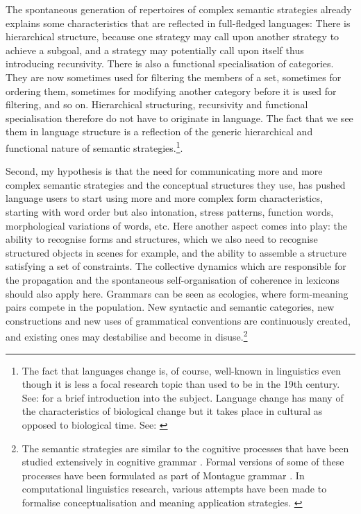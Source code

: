 The spontaneous generation of repertoires of complex 
semantic strategies already explains some characteristics 
that are reflected in full-fledged languages: 
There is hierarchical structure, because one strategy 
may call upon another strategy to achieve a subgoal, 
and a strategy may potentially call upon itself thus introducing 
recursivity. There is also a functional specialisation
of categories. They are now sometimes used for filtering
the members of a set, sometimes for ordering them, sometimes
for modifying another category before it is used for 
filtering, and so on. Hierarchical structuring, recursivity
and functional specialisation therefore do not have to 
originate in language. The fact that we see them in 
language structure is a reflection of the generic 
hierarchical and functional nature 
of semantic strategies.\footnote{
The fact that languages change is, of course, 
well-known in linguistics even though it is less a focal 
research topic than used to be in the 19th century. 
See: \cite{McMahon:1994} for a brief introduction into the 
subject. Language change has many of the characteristics
of biological change but it takes place in cultural 
as opposed to biological time. See: \cite{Labov:1994}}. 

Second, my hypothesis is that the need for communicating 
more and more complex semantic strategies and the 
conceptual structures they use, has pushed language 
users to start using more and more complex form characteristics, 
starting with word order but also intonation, stress 
patterns, function words, morphological variations of words, 
etc. Here another aspect comes into 
play: the ability to recognise forms and structures, 
which we also need to recognise structured objects in 
scenes for example, and the ability to assemble a 
structure satisfying a set of constraints. The collective
dynamics which are responsible for the propagation and the spontaneous 
self-organisation of coherence in lexicons should also apply  
here. Grammars can be seen as ecologies, where
form-meaning pairs compete in the population. New 
syntactic and semantic categories, new constructions and 
new uses of grammatical conventions are continuously created,
and existing ones may destabilise and become
in disuse.\footnote{
The semantic strategies are similar to the 
cognitive processes that have been studied extensively 
in cognitive grammar \cite{Langacker:1987}. Formal versions
of some of these processes have been formulated as 
part of Montague grammar \cite{Montague:1974}. In 
computational linguistics research, various 
attempts have been made to formalise conceptualisation
and meaning application strategies. \cite{Gazdar:1989}}

